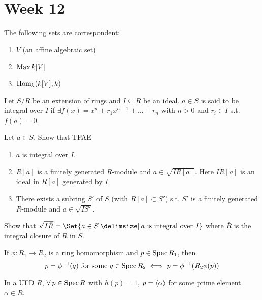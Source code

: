 
\section{Week 12}

\begin{exercise}
  The following sets are correspondent:
  \begin{enumerate}[(1)]
    \item $V$ (an affine algebraic set)
    \item $\operatorname{Max} k[V]$
    \item $\operatorname{Hom}_k(k[V], k)$
  \end{enumerate}
\end{exercise}

\begin{definition}
  Let $S/R$ be an extension of rings and $I \subseteq R$ be an ideal.
  $a \in S$ is said to be integral over $I$ if $\exists f(x) = x^n + r_1x^{n-1}
  + \dots + r_n$ with $n > 0$ and $r_i \in I$ s.t. $f(a) = 0$.
\end{definition}

\begin{exercise}
  Let $a \in S$. Show that TFAE
  \begin{enumerate}[(1)]
    \item $a$ is integral over $I$.
    \item $R[a]$ is a finitely generated $R$-module and $a \in \sqrt{IR[a]}$.
      Here $IR[a]$ is an ideal in $R[a]$ generated by $I$.
    \item There exists a subring $S'$ of $S$ (with $R[a] \subset S'$)
      s.t. $S'$ is a finitely generated $R$-module and $a \in \sqrt{IS'}$.
  \end{enumerate}
\end{exercise}

\begin{exercise}
  Show that $\sqrt{I\bar{R}} = \Set{a \in S \given a \text{~is integral over~} I}$
  where $\bar{R}$ is the integral closure of $R$ in $S$.
\end{exercise}

\begin{exercise}
  If $\phi: R_1 \to R_2$ is a ring homomorphism and $p \in \operatorname{Spec} R_1$, then
  \[
    p = \phi^{-1}(q) \text{ for some } q \in \operatorname{Spec} R_2
    \iff p = \phi^{-1}(R_2 \phi(p))
  \]
\end{exercise}

\begin{exercise}
  In a UFD $R$, $\forall p \in \Spec R$ with $h(p) = 1$, $p = \langle\alpha\rangle$ for
  some prime element $\alpha \in R$.
\end{exercise}
